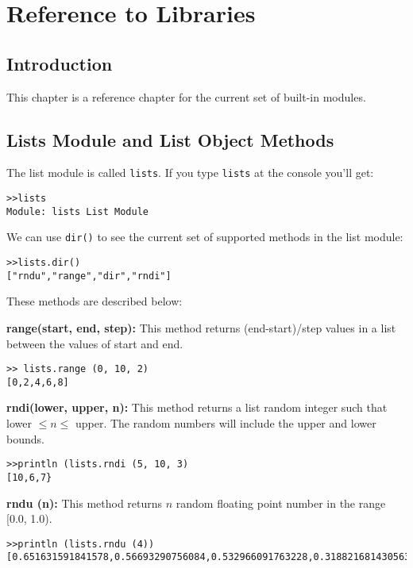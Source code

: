 {\bfseries\slshape\sffamily\color{ChapterTitleColor} \chapter{Reference to Libraries}} \label{chap:libraries}

\section{Introduction}

This chapter is a reference chapter for the current set of built-in modules.

\section{Lists Module and List Object Methods}

The list module is called {\tt lists}. If you type {\tt lists} at the console you'll get:

\begin{lstlisting}
>>lists
Module: lists List Module
\end{lstlisting}

We can use {\tt dir()} to see the current set of supported methods in the list module:

\begin{lstlisting}
>>lists.dir()
["rndu","range","dir","rndi"]
\end{lstlisting}

These methods are described below:

\colorbox{blue!10}{\bf range(start, end, step):} This method returns (end-start)/step values in a list between the values of start and end.

\begin{lstlisting}
>> lists.range (0, 10, 2)
[0,2,4,6,8]
\end{lstlisting}


\colorbox{blue!10}{\bf rndi(lower, upper, n):} This method returns a list random integer such that lower $\leq n \leq$ upper. The random numbers will include the upper and lower bounds.

\begin{lstlisting}
>>println (lists.rndi (5, 10, 3)
[10,6,7}
\end{lstlisting}


\colorbox{blue!10}{\bf rndu (n):} This method returns $n$ random floating point number in the range [0.0, 1.0).

\begin{lstlisting}
>>println (lists.rndu (4))
[0.651631591841578,0.56693290756084,0.532966091763228,0.318821681430563]
\end{lstlisting}


